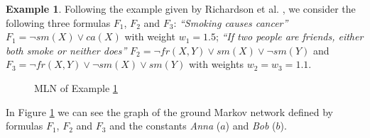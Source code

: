 \documentclass[letterpaper]{article}
\theoremstyle{plain}
\theoremstyle{definition}
\theoremstyle{remark}
\theoremstyle{definition}
\newtheorem{example}{Example}[section]
\begin{document}
\begin{example}\label{ex_mln}
Following the example given by Richardson et al. \cite{markovLogicNetworks}, we consider the following three formulas $F_1$, $F_2$ and $F_3$: \emph{``Smoking causes cancer''} $F_1=\neg sm(X) \vee ca(X)$ with weight $w_1=1.5$; 
\emph{``If two people are friends, either both smoke or neither does''} $F_2 = \neg fr(X, Y) \vee sm(X) \vee \neg sm(Y)$ and $F_3= \neg fr(X, Y) \vee \neg sm(X) \vee sm(Y) $ with weights $w_2=w_3=1.1$.
\begin{figure}[h!]
\centering
{}
\caption{MLN of Example \ref{ex_mln}}
\label{mln}
\end{figure}
In Figure \ref{mln} we can see the graph of the ground Markov network defined by formulas $F_1$, $F_2$ and $F_3$ and the constants \emph{Anna} ($a$) and \emph{Bob} ($b$).



\end{example}
\end{document}

